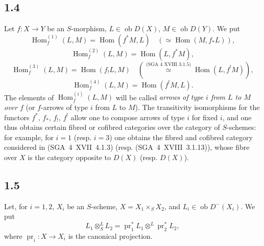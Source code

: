 \documentclass[11pt]{article}
\DeclareMathOperator{\Hom}{Hom}
\newcommand{\ob}{\operatorname{ob}}
\providecommand{\pr}{\operatorname{pr}}
\providecommand{\Hom}{\operatorname{Hom}}
\providecommand{\ob}{\operatorname{ob}}
\providecommand{\pr}{\operatorname{pr}}
\providecommand{\Hom}{\operatorname{Hom}}
\begin{document}
\subsection*{1.4}
Let $f:X\to Y$ be an $S$-morphism, $L\in\ob D(X)$, $M\in\ob D(Y)$. We put
\[
\Hom_f^{(1)}(L,M)=\Hom(f^{*}M,L)\quad (\simeq \Hom(M,f_{*}L)),
\]
\[
\Hom_f^{(2)}(L,M)=\Hom(L,f^{*}M),
\]
\[
\Hom_f^{(3)}(L,M)=\Hom(f_{!}L,M)\quad (\overset{\text{(SGA~4~XVIII~3.1.5)}}{\simeq} \Hom(L,f^{!}M)),
\]
\[
\Hom_f^{(4)}(L,M)=\Hom(f^{!}M,L).
\]
The elements of $\Hom_f^{(i)}(L,M)$ will be called \emph{arrows of type $i$ from $L$ to $M$ over $f$} (or $f$-arrows of type $i$ from $L$ to $M$). The transitivity isomorphisms for the functors $f^{*}$, $f_{*}$, $f_{!}$, $f^{!}$ allow one to compose arrows of type $i$ for fixed $i$, and one thus obtains certain fibred or cofibred categories over the category of $S$-schemes: for example, for $i=1$ (resp. $i=3$) one obtains the fibred and cofibred category considered in (SGA~4~XVII~4.1.3) (resp. (SGA~4~XVIII~3.1.13)), whose fibre over $X$ is the category opposite to $D(X)$ (resp. $D(X)$).

\subsection*{1.5}
Let, for $i=1,2$, $X_i$ be an $S$-scheme, $X=X_1\times_SX_2$, and $L_i\in\ob D^{-}(X_i)$. We put
\[
L_1\otimes^L_SL_2=\pr_1^{*}L_1\otimes^L\pr_2^{*}L_2,
\]
where $\pr_i:X\to X_i$ is the canonical projection.
\end{document}
